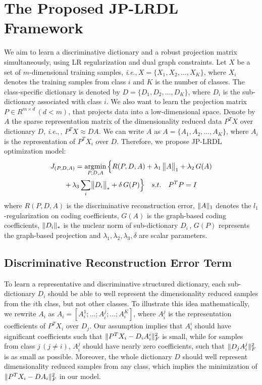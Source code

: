 \documentclass[journal]{IEEEtran}
\newcommand{\ie}{\textit{i}.\textit{e}.,\,}
\DeclareMathOperator*{\argmin}{\arg\!\min}
\DeclarePairedDelimiter\norm{\lVert}{\rVert}
\begin{document}
\section{The Proposed JP-LRDL Framework}
\label{sec:proposed}
We aim to learn a discriminative dictionary and a robust projection matrix simultaneously, using LR regularization and dual graph constraints. 
Let $X$ be a set of $m$-dimensional training samples, \ie $X=\{ X_1, X_2, \dots , X_K \}$, where $X_i$ denotes the training samples from class $i$ and $K$ is the number of classes. The class-specific dictionary is denoted by $D=\{ D_1, D_2, \dots , D_K \}$, where $D_i$ is the sub-dictionary associated with class $i$. 
We also want to learn the projection matrix $P \in R^{m \times d} \, (d<m)$, that projects data into a low-dimensional space. Denote by $A$ the sparse representation matrix of the dimensionality reduced data $P^T X$ over dictionary $D$, \ie, $P^T X \approx DA$. We can write $A$ as $A=\{ A_1, A_2, \dots , A_K \}$, where $A_i$ is the representation of $P^T X_i$ over $D$. Therefore, we propose JP-LRDL optimization model:
\begin{gather}
J_{(P,D,A)} = \argmin_{P,D,A} \Big\{ R(P,D,A) + \lambda_{1} \, \norm[\big]{A}_{1} + \lambda_{2} \, G(A)   
\label{eq1} \\ \notag
+ \, \lambda_{3} \sum\limits_{i}  \norm[\big]{D_i}_{*}  +  \delta \, G(P) \Big\} \quad s.t. \quad P^TP=I
\end{gather}
where $R(P,D,A)$ is the discriminative reconstruction error, $\norm{A}_{1}$ denotes the $l_1$-regularization on coding coefficients, $G(A)$ is the graph-based coding coefficients, $\norm{D_i}_{*}$ is the nuclear norm of sub-dictionary $D_i \,$, $G(P)$ represents the graph-based projection and $\lambda_{1}, \lambda_{2}, \lambda_{3}, \delta$ are scalar parameters. %
\subsection{Discriminative Reconstruction Error Term}
To learn a representative and discriminative structured dictionary, each sub-dictionary $D_i$ should be able to well represent the dimensionality reduced samples from the $i$th class, but not other classes. To illustrate this idea mathematically, we rewrite $A_i$ as $A_i = [A_i^1 ; \dots; A_i^j ; \dots ; A_i^K]$, where $A_i^j$ is the representation coefficients of $P^T X_i$ over $D_j$. Our assumption implies that $A_i^i$ should have significant coefficients such that $\norm{P^T X_i - D_i A_i^i}_{F}^2$ is small, while for samples from class $j \, (j \neq i)$, $A_i^j$ should have nearly zero coefficients, such that $\norm{D_j A_i^j}_{F}^2$ is as small as possible. Moreover, the whole dictionary $D$ should well represent dimensionality reduced samples from any class, which implies the minimization of $\norm{P^T X_i - D A_i}_{F}^2$ in our model. 
\end{document}
